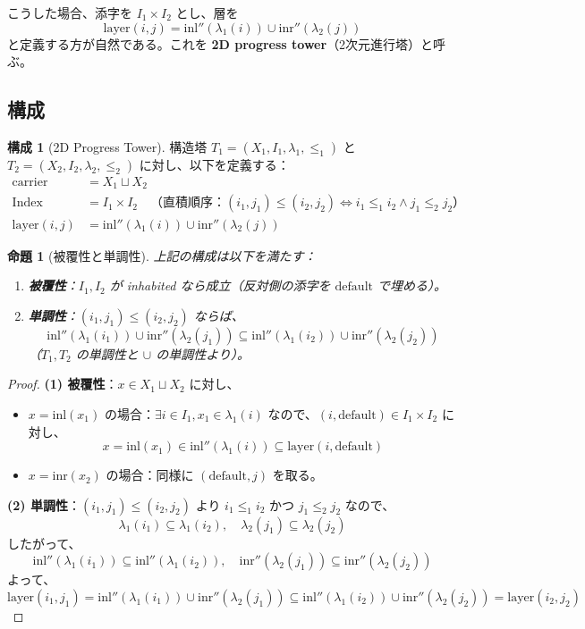 \documentclass[a4paper,12pt]{ltjsarticle}
\newtheorem{proposition}[definition]{命題}
\theoremstyle{definition}
\newtheorem{construction}[definition]{構成}
\begin{document}
こうした場合、添字を $I_1 \times I_2$ とし、層を
\[
\text{layer}(i, j) = \mathrm{inl}''(\lambda_1(i)) \cup \mathrm{inr}''(\lambda_2(j))
\]
と定義する方が自然である。これを \textbf{2D progress tower}（2次元進行塔）と呼ぶ。

\subsection{構成}

\begin{construction}[2D Progress Tower]
構造塔 $T_1 = (X_1, I_1, \lambda_1, \leq_1)$ と $T_2 = (X_2, I_2, \lambda_2, \leq_2)$ に対し、以下を定義する：
\begin{align*}
    \text{carrier} &= X_1 \sqcup X_2 \\
    \text{Index} &= I_1 \times I_2 \quad \text{（直積順序：$(i_1, j_1) \leq (i_2, j_2) \iff i_1 \leq_1 i_2 \land j_1 \leq_2 j_2$）} \\
    \text{layer}(i, j) &= \mathrm{inl}''(\lambda_1(i)) \cup \mathrm{inr}''(\lambda_2(j))
\end{align*}
\end{construction}

\begin{proposition}[被覆性と単調性]
上記の構成は以下を満たす：
\begin{enumerate}
    \item \textbf{被覆性}：$I_1, I_2$ が inhabited なら成立（反対側の添字を $\mathrm{default}$ で埋める）。
    \item \textbf{単調性}：$(i_1, j_1) \leq (i_2, j_2)$ ならば、
    \[
    \mathrm{inl}''(\lambda_1(i_1)) \cup \mathrm{inr}''(\lambda_2(j_1)) \subseteq \mathrm{inl}''(\lambda_1(i_2)) \cup \mathrm{inr}''(\lambda_2(j_2))
    \]
    （$T_1, T_2$ の単調性と $\cup$ の単調性より）。
\end{enumerate}
\end{proposition}

\begin{proof}
\textbf{(1) 被覆性}：$x \in X_1 \sqcup X_2$ に対し、
\begin{itemize}
    \item $x = \mathrm{inl}(x_1)$ の場合：$\exists i \in I_1, x_1 \in \lambda_1(i)$ なので、$(i, \mathrm{default}) \in I_1 \times I_2$ に対し、
    \[
    x = \mathrm{inl}(x_1) \in \mathrm{inl}''(\lambda_1(i)) \subseteq \text{layer}(i, \mathrm{default})
    \]
    \item $x = \mathrm{inr}(x_2)$ の場合：同様に $(\mathrm{default}, j)$ を取る。
\end{itemize}

\textbf{(2) 単調性}：$(i_1, j_1) \leq (i_2, j_2)$ より $i_1 \leq_1 i_2$ かつ $j_1 \leq_2 j_2$ なので、
\[
\lambda_1(i_1) \subseteq \lambda_1(i_2), \quad \lambda_2(j_1) \subseteq \lambda_2(j_2)
\]
したがって、
\[
\mathrm{inl}''(\lambda_1(i_1)) \subseteq \mathrm{inl}''(\lambda_1(i_2)), \quad
\mathrm{inr}''(\lambda_2(j_1)) \subseteq \mathrm{inr}''(\lambda_2(j_2))
\]
よって、
\[
\text{layer}(i_1, j_1) = \mathrm{inl}''(\lambda_1(i_1)) \cup \mathrm{inr}''(\lambda_2(j_1)) \subseteq \mathrm{inl}''(\lambda_1(i_2)) \cup \mathrm{inr}''(\lambda_2(j_2)) = \text{layer}(i_2, j_2)
\]
\end{proof}
\end{document}
